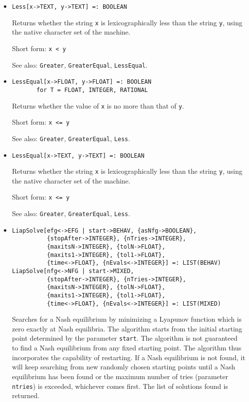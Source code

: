 \begin{itemize}
\item
\protect \large \begin{verbatim}
Less[x->TEXT, y->TEXT] =: BOOLEAN
\end{verbatim}\normalsize

\bd
Returns whether the string \verb+x+ is lexicographically less than
the string \verb+y+, using the native character set of the machine.
\item
[Short form:] \verb+x < y+
\item
[See also:] {\tt Greater}, {\tt GreaterEqual}, {\tt LessEqual}.
\ed

\item
\protect \large \begin{verbatim}
LessEqual[x->FLOAT, y->FLOAT] =: BOOLEAN
       for T = FLOAT, INTEGER, RATIONAL
\end{verbatim}\normalsize

\bd
Returns whether the value of \verb+x+ is no more than that
of \verb+y+.
\item
[Short form:] \verb+x <= y+
\item
[See also:] {\tt Greater}, {\tt GreaterEqual}, {\tt Less}.
\ed

\item
\protect \large \begin{verbatim}
LessEqual[x->TEXT, y->TEXT] =: BOOLEAN
\end{verbatim}\normalsize

\bd
Returns whether the string \verb+x+ is lexicographically less than
the string \verb+y+, using the native character set of the machine.
\item
[Short form:] \verb+x <= y+
\item
[See also:] {\tt Greater}, {\tt GreaterEqual}, {\tt Less}.
\ed

\item
\protect \large \begin{verbatim}
LiapSolve[efg<->EFG | start->BEHAV, {asNfg->BOOLEAN},
          {stopAfter->INTEGER}, {nTries->INTEGER},
          {maxitsN->INTEGER}, {tolN->FLOAT},
          {maxits1->INTEGER}, {tol1->FLOAT},
          {time<->FLOAT}, {nEvals<->INTEGER}] =: LIST(BEHAV)
LiapSolve[nfg<->NFG | start->MIXED, 
          {stopAfter->INTEGER}, {nTries->INTEGER},
          {maxitsN->INTEGER}, {tolN->FLOAT},
          {maxits1->INTEGER}, {tol1->FLOAT},
          {time<->FLOAT}, {nEvals<->INTEGER}] =: LIST(MIXED)
\end{verbatim}\normalsize


\bd Searches for a Nash equilibrium by minimizing a Lyapunov function
which is zero exactly at Nash equilibria.  The algorithm starts from
the initial starting point determined by the parameter \verb+start+.
The algorithm is not guaranteed to find a Nash equilibrium from any
fixed starting point.  The algorithm thus incorporates the capability
of restarting.  If a Nash equilibrium is not found, it will keep
searching from new randomly chosen starting points until a Nash
equilibrium has been found or the maximum number of tries (parameter
\verb+ntries+) is exceeded, whichever comes first.  The list of
solutions found is returned.


\end{itemize}
